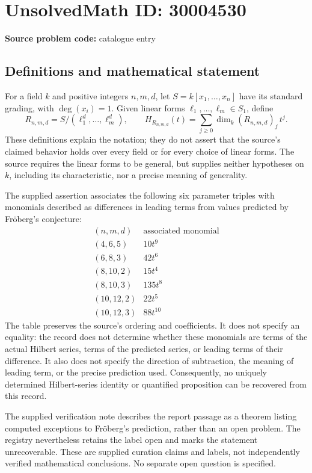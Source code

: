 \documentclass[11pt]{article}
\begin{document}
\section*{UnsolvedMath ID: 30004530}
\textbf{Source problem code:} catalogue entry
\subsection{Definitions and mathematical statement}
For a field \(k\) and positive integers \(n,m,d\), let \(S=k[x_1,\ldots,x_n]\) have its standard grading, with \(\deg(x_i)=1\). Given linear forms \(\ell_1,\ldots,\ell_m\in S_1\), define
\[
R_{n,m,d}=S/(\ell_1^d,\ldots,\ell_m^d),\qquad
H_{R_{n,m,d}}(t)=\sum_{j\geq 0}\dim_k(R_{n,m,d})_j\,t^j.
\]
These definitions explain the notation; they do not assert that the source's claimed behavior holds over every field or for every choice of linear forms. The source requires the linear forms to be general, but supplies neither hypotheses on \(k\), including its characteristic, nor a precise meaning of generality.

The supplied assertion associates the following six parameter triples with monomials described as differences in leading terms from values predicted by Fr\"oberg's conjecture:
\[
\begin{array}{c|c}
(n,m,d)&\text{associated monomial}\\ \hline
(4,6,5)&10t^9\\
(6,8,3)&42t^6\\
(8,10,2)&15t^4\\
(8,10,3)&135t^8\\
(10,12,2)&22t^5\\
(10,12,3)&88t^{10}
\end{array}
\]
The table preserves the source's ordering and coefficients. It does not specify an equality: the record does not determine whether these monomials are terms of the actual Hilbert series, terms of the predicted series, or leading terms of their difference. It also does not specify the direction of subtraction, the meaning of leading term, or the precise prediction used. Consequently, no uniquely determined Hilbert-series identity or quantified proposition can be recovered from this record.

The supplied verification note describes the report passage as a theorem listing computed exceptions to Fr\"oberg's prediction, rather than an open problem. The registry nevertheless retains the label open and marks the statement unrecoverable. These are supplied curation claims and labels, not independently verified mathematical conclusions. No separate open question is specified.
\end{document}

